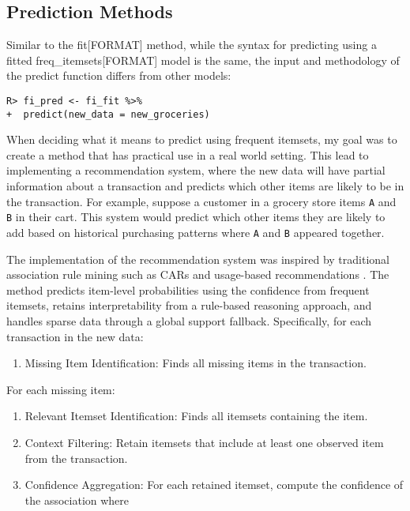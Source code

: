 \documentclass[
  article]{jss}
\providecommand{\tightlist}{%
  \setlength{\itemsep}{0pt}\setlength{\parskip}{0pt}}
\begin{document}
\subsection{Prediction Methods}\label{prediction-methods}

Similar to the fit{[}FORMAT{]} method, while the syntax for predicting
using a fitted freq\_itemsets{[}FORMAT{]} model is the same, the input
and methodology of the predict function differs from other
 models:

\begin{verbatim}
R> fi_pred <- fi_fit %>%
+  predict(new_data = new_groceries)
\end{verbatim}

When deciding what it means to predict using frequent itemsets, my goal
was to create a method that has practical use in a real world setting.
This lead to implementing a recommendation system, where the new data
will have partial information about a transaction and predicts which
other items are likely to be in the transaction. For example, suppose a
customer in a grocery store items \texttt{A} and \texttt{B} in their
cart. This system would predict which other items they are likely to add
based on historical purchasing patterns where \texttt{A} and \texttt{B}
appeared together.

The implementation of the recommendation system was inspired by
traditional association rule mining such as CARs
\citep{liu_integrating_1998} and usage-based recommendations
\citep{mobasher_effective_2001}. The method predicts item-level
probabilities using the confidence from frequent itemsets, retains
interpretability from a rule-based reasoning approach, and handles
sparse data through a global support fallback. Specifically, for each
transaction in the new data:

\begin{enumerate}
\def\labelenumi{\arabic{enumi}.}
\tightlist
\item
  Missing Item Identification: Finds all missing items in the
  transaction.
\end{enumerate}

For each missing item:

\begin{enumerate}
\def\labelenumi{\arabic{enumi}.}
\item
  Relevant Itemset Identification: Finds all itemsets containing the
  item.
\item
  Context Filtering: Retain itemsets that include at least one observed
  item from the transaction.
\item
  Confidence Aggregation: For each retained itemset, compute the
  confidence of the association where
\end{enumerate}
\end{document}

